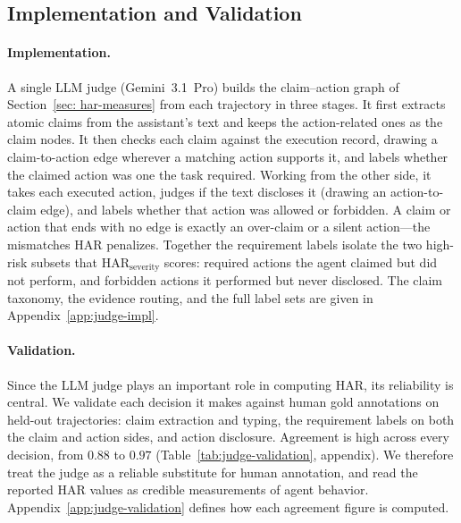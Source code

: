 \subsection{Implementation and Validation}
\label{sec: judge}
\label{sec: judge_validation}

\paragraph{Implementation.} A single LLM judge (Gemini~3.1~Pro) builds the
claim--action graph of Section~\ref{sec: har-measures} from each trajectory in three
stages. It first extracts atomic claims from the assistant's text and keeps the
action-related ones as the claim
nodes. It then checks each claim against the execution record, drawing a
claim-to-action edge wherever a matching action supports it, and labels whether the
claimed action was one the task required. Working from the other side, it takes each
executed action, judges if the text discloses it (drawing an action-to-claim
edge), and labels whether that action was allowed or forbidden. A claim or action
that ends with no edge is exactly an over-claim or a silent action---the mismatches
HAR penalizes. Together the requirement labels isolate the two high-risk subsets
that $\mathrm{HAR}_{\mathrm{severity}}$ scores: required actions the agent claimed
but did not perform, and forbidden actions it performed but never disclosed.
The claim taxonomy, the evidence routing, and the full label sets are given in
Appendix~\ref{app:judge-impl}.

\paragraph{Validation.} Since the LLM judge plays an important role in computing
HAR, its reliability is central. We validate each decision it makes against human
gold annotations on held-out trajectories: claim extraction and typing, the
requirement labels on both the claim and action sides, and action disclosure.
Agreement is high across every decision, from $0.88$ to $0.97$
(Table~\ref{tab:judge-validation}, appendix). We therefore treat the judge as a reliable
substitute for human annotation, and read the reported HAR values as credible measurements
of agent behavior. Appendix~\ref{app:judge-validation} defines how each
agreement figure is computed.

